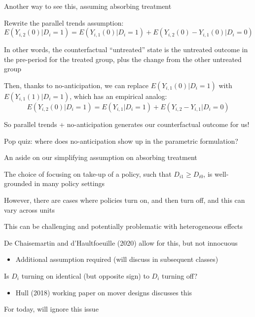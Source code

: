 \documentclass[notes,11pt, aspectratio=169]{beamer}
\newenvironment{wideitemize}{\itemize\addtolength{\itemsep}{10pt}}{\enditemize}
\begin{document}
\begin{frame}{Another way to see this, assuming absorbing treatment}
  \begin{wideitemize}
  \item Rewrite the parallel trends assumption:
        \begin{equation*}
        E(Y_{i,2}(0)| D_{i} = 1) =  E( Y_{i,1}(0) |D_{i} = 1) +   E(Y_{i,2}(0) - Y_{i,1}(0) | D_{i} = 0)
      \end{equation*}
    \item In other words, the counterfactual ``untreated'' state is
      the untreated outcome in the pre-period for the treated group,
      plus the change from the other untreated group
    \item Then, thanks to no-anticipation, we can replace
      $E( Y_{i,1}(0) |D_{i} = 1)$ with $E( Y_{i,1}(1) |D_{i} = 1)$,
      which has an empirical analog:
        \begin{equation*}
        E(Y_{i,2}(0)| D_{i} = 1) =  E( Y_{i,1} |D_{i} = 1) +   E(Y_{i,2} - Y_{i,1} | D_{i} = 0)
      \end{equation*}
    \item So parallel trends + no-anticipation generates our
      counterfactual outcome for us!
    \item Pop quiz: where does no-anticipation show up in the
      parametric formulation?
  \end{wideitemize}

\end{frame}

\begin{frame}{An aside on our simplifying assumption on absorbing treatment}
  \begin{wideitemize}
  \item The choice of focusing on take-up of a policy, such that $D_{i1} \geq D_{i0}$, is well-grounded in many policy settings
  \item However, there are cases where policies turn on, and then turn off, and this can vary across units
  \item This can be challenging and potentially problematic with
    heterogeneous effects
  \item De Chaisemartin and d'Haultfoeuille (2020) allow for this, but not innocuous
    \begin{itemize}
    \item Additional assumption required (will discuss in subsequent classes)
    \end{itemize}
  \item Is $D_{i}$ turning on identical (but opposite sign) to $D_{i}$
    turning off?
    \begin{itemize}
    \item Hull (2018) working paper on mover designs discusses this
    \end{itemize}
  \item For today, will ignore this issue
  \end{wideitemize}
\end{frame}
\end{document}
